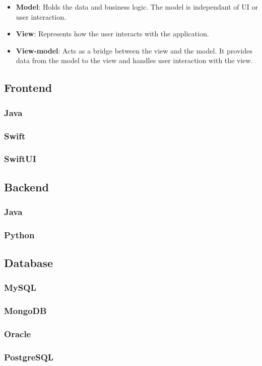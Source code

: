 \begin{itemize}
    \item \textbf{Model}: Holds the data and business logic. The model is independant of UI or user interaction.
    \item \textbf{View}: Represents how the user interacts with the application.
    \item \textbf{View-model}: Acts as a bridge between the view and the model. It provides data from the model to the view and handles user interaction with the view.
\end{itemize}

\subsection{Frontend}

\subsubsection{Java}



\subsubsection{Swift}



\subsubsection{SwiftUI}



\subsection{Backend}

\subsubsection{Java}



\subsubsection{Python}



\subsection{Database}

\subsubsection{MySQL}



\subsubsection{MongoDB}



\subsubsection{Oracle}



\subsubsection{PostgreSQL}

